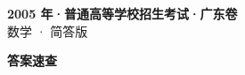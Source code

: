\documentclass[zihao=-4, a4paper]{ctexart}
\begin{document}
\begin{center}
  {\Large\bfseries 2005 年·普通高等学校招生考试·广东卷}\\[4pt]
  {\large 数学 · 简答版}
\end{center}
\medskip
{}

\clearpage
{}
\begin{center}{\Large\bfseries 答案速查}\end{center}
\medskip

\end{document}
